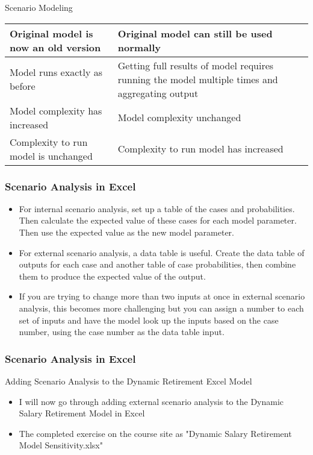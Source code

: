 \documentclass[handout, 11pt]{beamer}
\begin{document}
\begin{section}{Scenario Modeling}
\begin{frame}
\begin{center}
\begin{tabular}{L{5cm}|R{5cm}}
\midrule
\midrule
Original model is now an old version & Original model can still be used normally\\

\midrule
Model runs exactly as before & Getting full results of model requires running the model multiple times and aggregating output\\

\midrule
Model complexity has increased & Model complexity unchanged\\

\midrule
Complexity to run model is unchanged & Complexity to run model has increased\\

\end{tabular}
\end{center}
\end{frame}
\begin{frame}
\frametitle{Scenario Analysis in Excel}
\begin{itemize}
\item For internal scenario analysis, set up a table of the cases and probabilities. Then calculate the expected value of these cases for each model parameter. Then use the expected value as the new model parameter.
\vfill
\item For external scenario analysis, a data table is useful. Create the data table of outputs for each case and another table of case probabilities, then combine them to produce the expected value of the output.
\vfill
\item If you are trying to change more than two inputs at once in external scenario analysis, this becomes more challenging but you can assign a number to each set of inputs and have the model look up the inputs based on the case number, using the case number as the data table input.
\end{itemize}
\end{frame}
\begin{frame}
\frametitle{Scenario Analysis in Excel}
{
\begin{block}{Adding Scenario Analysis to the Dynamic Retirement Excel Model}
\begin{itemize}
\item I will now go through adding external scenario analysis to the Dynamic Salary Retirement Model in Excel
\item The completed exercise on the course site as "Dynamic Salary Retirement Model Sensitivity.xlsx"
\end{itemize}

\end{block}}
\end{frame}
\end{section}
\end{document}
